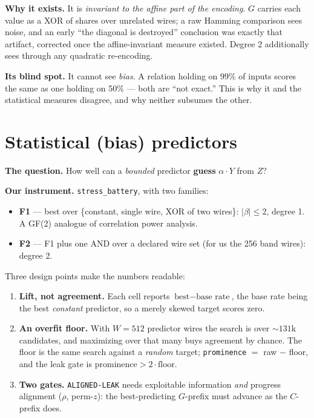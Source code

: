 \documentclass[11pt]{article}
\newcommand{\code}[1]{\texttt{#1}}
\begin{document}
\textbf{Why it exists.} It is \emph{invariant to the affine part of the
encoding}. $G$ carries each value as a XOR of shares over unrelated wires; a raw
Hamming comparison sees noise, and an early ``the diagonal is destroyed''
conclusion was exactly that artifact, corrected once the affine-invariant
measure existed. Degree 2 additionally sees through any quadratic re-encoding.

\textbf{Its blind spot.} It cannot see \emph{bias}. A relation holding on 99\%
of inputs scores the same as one holding on 50\% --- both are ``not exact.''
This is why it and the statistical measures disagree, and why neither subsumes
the other.

\section{Statistical (bias) predictors}

\textbf{The question.} How well can a \emph{bounded} predictor \textbf{guess}
$\alpha \cdot Y$ from $Z$?

\textbf{Our instrument.} \code{stress\_battery}, with two families:
\begin{itemize}
  \item \textbf{F1} --- best over \{constant, single wire, XOR of two wires\}:
        $|\beta| \le 2$, degree 1. A GF(2) analogue of correlation power analysis.
  \item \textbf{F2} --- F1 plus one AND over a declared wire set (for us the 256
        band wires): degree 2.
\end{itemize}

Three design points make the numbers readable:
\begin{enumerate}
  \item \textbf{Lift, not agreement.} Each cell reports $\text{best} -
        \text{base rate}$, the base rate being the best \emph{constant}
        predictor, so a merely skewed target scores zero.
  \item \textbf{An overfit floor.} With $W = 512$ predictor wires the search is
        over ${\sim}131$k candidates, and maximizing over that many buys
        agreement by chance. The floor is the same search against a
        \emph{random} target; \code{prominence} $=$ raw $-$ floor, and the leak
        gate is $\text{prominence} > 2\cdot\text{floor}$.
  \item \textbf{Two gates.} \code{ALIGNED-LEAK} needs exploitable information
        \emph{and} progress alignment ($\rho$, perm-$z$): the best-predicting
        $G$-prefix must advance as the $C$-prefix does.
\end{enumerate}
\end{document}

